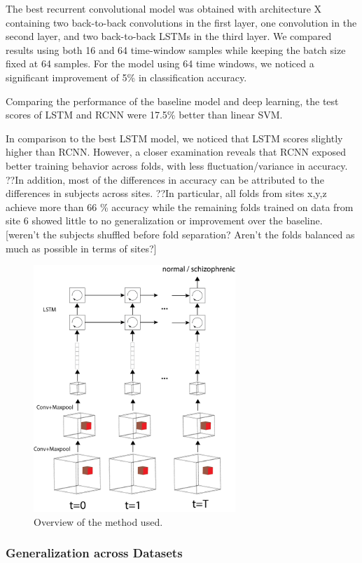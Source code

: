 \documentclass{article} %
\begin{document}
The best recurrent convolutional model was obtained with architecture X containing two back-to-back convolutions in the first layer, one convolution in the second layer, and two back-to-back LSTMs in the third layer. We compared results using both 16 and 64 time-window samples while keeping the batch size fixed at 64 samples. For the model using 64 time windows, we noticed a significant improvement of 5\% in classification accuracy.

Comparing the performance of the baseline model and deep learning, the test scores of LSTM and RCNN were 17.5\% better than linear SVM.

In comparison to the best LSTM model, we noticed that LSTM scores slightly higher than RCNN. However, a closer examination reveals that RCNN exposed better training behavior across folds, with less fluctuation/variance in accuracy. ??In addition, most of the differences in accuracy can be attributed to the differences in subjects across sites. ??In particular, all folds from sites x,y,z achieve more than 66 \% accuracy while the remaining folds trained on data from site 6 showed little to no generalization or improvement over the baseline. [weren't the subjects shuffled before fold separation? Aren't the folds balanced as much as possible in terms of sites?]

\begin{figure}[t]
\begin{center}
\includegraphics[width=3in]{figures/overview.png}
\end{center}
\caption{Overview of the method used.}
\label{fig1}
\end{figure}

\subsubsection*{Generalization across Datasets}
\end{document}
